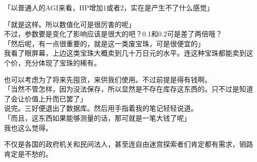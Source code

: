 「以普通人的AGI来看，HP增加1或者2，实在是产生不了什么感觉」

「就是这样。所以数值化可是很厉害的呢」\\

不过，参数要是变化了影响应该是很大的吧？0.1和0.2可是差了两倍哦？\\

「然后呢，有一点很重要的，就是这一类废宝珠，可是很便宜的」\\

我看了眼屏幕，上边这类宝珠大概卖到几十万日元的水平。连这种宝珠都能卖到这个价，充分体现了宝珠的稀有。

也可以考虑为了将来先囤货，来供我们使用。不过前提是得有钱啊。\\

「当然不管怎样，因为没法保存，所以显然是不存在库存这东西的。只不过是知道了会让价值上升而已罢了」\\

说完。三好便退出了数据库。然后用手指着我的笔记轻轻说道。\\

「而且，这东西如果能够测量的话，那可就是一笔大钱了呢」\\

我也这么觉得。

不仅是各国的政府机关和民间法人，甚至连自由迷宫探索者们肯定都有需求，销路肯定是不愁的。\\


